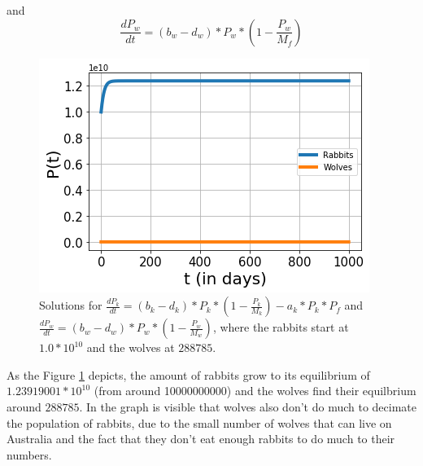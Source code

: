 \documentclass{article}
\begin{document}
and 
$$\frac{dP_w}{dt}=(b_w-d_w)*P_w*(1-\frac{P_w}{M_f})$$
\begin{figure}[h!]
    \centering
    \includegraphics[scale=0.78]{Pictures/RabbitWolves.png}
    \caption{Solutions for $\frac{dP_k}{dt}=(b_k-d_k)*P_k*(1-\frac{P_k}{M_k})-a_k*P_k*P_f$ and $\frac{dP_w}{dt}=(b_w-d_w)*P_w*(1-\frac{P_w}{M_w})$, where the rabbits start at $1.0*10^{10}$ and the wolves at $288785$.}
    \label{fig:RabbitsWolves}
\end{figure}
As the Figure \ref{fig:RabbitsWolves} depicts, the amount of rabbits grow to its equilibrium of $1.23919001*10^{10}$ (from around 10000000000) and the wolves find their equilbrium around $288785$. In the graph is visible that wolves also don't do much to decimate the population of rabbits, due to the small number of wolves that can live on Australia and the fact that they don't eat enough rabbits to do much to their numbers.
\medskip

\end{document}
